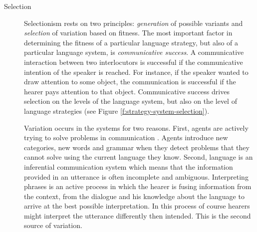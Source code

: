 \begin{description}
\item[Selection]
Selectionism rests on two principles: \emph{generation} of
possible variants and \emph{selection} of variation based on fitness. 
The most important factor in determining the fitness of a 
particular language strategy, but also
of a particular language system, is \emph{communicative success}.
A communicative interaction between two interlocutors is successful if the
communicative intention of the speaker is reached. For instance, if the speaker
wanted to draw attention to some object, the communication is successful if the
hearer pays attention to that object. Communicative success drives selection
on the levels of the language system, but also on the level of language
strategies (see Figure \ref{f:strategy-system-selection}). 

Variation occurs in the systems for two reasons. 
First, agents are actively trying to solve 
problems in communication \citep{steels2000language}. 
Agents introduce new categories, 
new words and grammar when they detect problems that they 
cannot solve using the current
language they know. Second, language is an inferential 
communication system \citep{sperber1986relevance} which means 
that the information provided in an utterance is often 
incomplete and ambiguous. Interpreting phrases is an active 
process in which the hearer
is fusing information from the context, from the dialogue 
and his knowledge about the language 
to arrive at the best possible interpretation. In this process 
of course hearers might interpret
the utterance differently then intended. This is the 
second source of variation.


\end{description}
